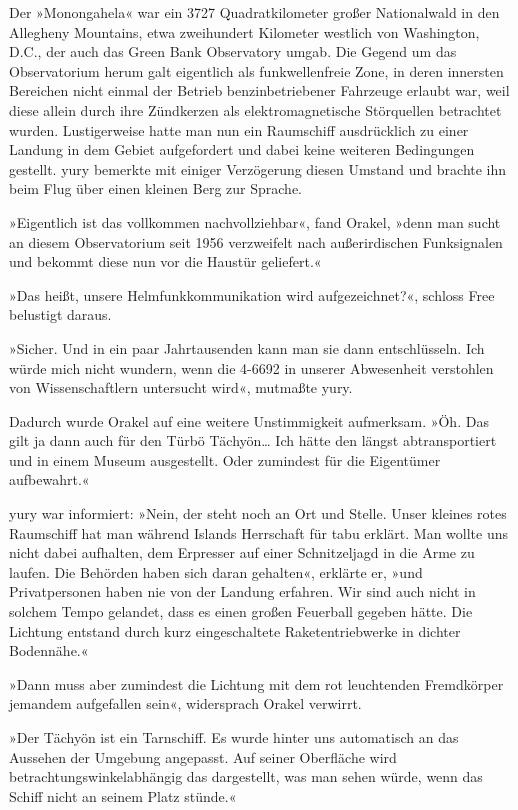 Der »Monongahela« war ein 3727 Quadratkilometer großer Nationalwald in den Allegheny Mountains, etwa zweihundert Kilometer westlich von Washington, D.C., der auch das Green Bank Observatory umgab. Die Gegend um das Observatorium herum galt eigentlich als funkwellenfreie Zone, in deren innersten Bereichen nicht einmal der Betrieb benzinbetriebener Fahrzeuge erlaubt war, weil diese allein durch ihre Zündkerzen als elektromagnetische Störquellen betrachtet wurden. Lustigerweise hatte man nun ein Raumschiff ausdrücklich zu einer Landung in dem Gebiet aufgefordert und dabei keine weiteren Bedingungen gestellt. yury bemerkte mit einiger Verzögerung diesen Umstand und brachte ihn beim Flug über einen kleinen Berg zur Sprache.

»Eigentlich ist das vollkommen nachvollziehbar«, fand Orakel, »denn man sucht an diesem Observatorium seit 1956 verzweifelt nach außerirdischen Funksignalen und bekommt diese nun vor die Haustür geliefert.«

»Das heißt, unsere Helmfunkkommunikation wird aufgezeichnet?«, schloss Free belustigt daraus.

»Sicher. Und in ein paar Jahrtausenden kann man sie dann entschlüsseln. Ich würde mich nicht wundern, wenn die 4-6692 in unserer Abwesenheit verstohlen von Wissenschaftlern untersucht wird«, mutmaßte yury.

Dadurch wurde Orakel auf eine weitere Unstimmigkeit aufmerksam. »Öh. Das gilt ja dann auch für den Türbö Tächyön… Ich hätte den längst abtransportiert und in einem Museum ausgestellt. Oder zumindest für die Eigentümer aufbewahrt.«

yury war informiert: »Nein, der steht noch an Ort und Stelle. Unser kleines rotes Raumschiff hat man während Islands Herrschaft für tabu erklärt. Man wollte uns nicht dabei aufhalten, dem Erpresser auf einer Schnitzeljagd in die Arme zu laufen. Die Behörden haben sich daran gehalten«, erklärte er, »und Privatpersonen haben nie von der Landung erfahren. Wir sind auch nicht in solchem Tempo gelandet, dass es einen großen Feuerball gegeben hätte. Die Lichtung entstand durch kurz eingeschaltete Raketentriebwerke in dichter Bodennähe.«

»Dann muss aber zumindest die Lichtung mit dem rot leuchtenden Fremdkörper jemandem aufgefallen sein«, widersprach Orakel verwirrt.

»Der Tächyön ist ein Tarnschiff. Es wurde hinter uns automatisch an das Aussehen der Umgebung angepasst. Auf seiner Oberfläche wird betrachtungswinkelabhängig das dargestellt, was man sehen würde, wenn das Schiff nicht an seinem Platz stünde.«

